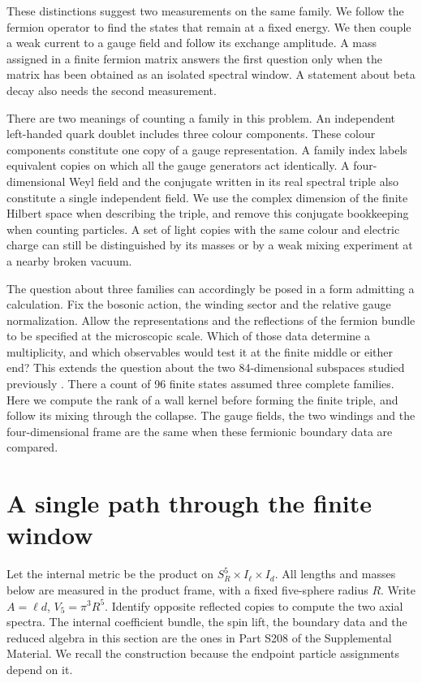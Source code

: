 \documentclass[aps,prd,reprint,onecolumn,nofootinbib,amsmath,amssymb]{revtex4-2}
\begin{document}
These distinctions suggest two measurements on the same family. We follow the fermion operator to find the states that remain at a fixed energy. We then couple a weak current to a gauge field and follow its exchange amplitude. A mass assigned in a finite fermion matrix answers the first question only when the matrix has been obtained as an isolated spectral window. A statement about beta decay also needs the second measurement.

There are two meanings of counting a family in this problem. An independent left-handed quark doublet includes three colour components. These colour components constitute one copy of a gauge representation. A family index labels equivalent copies on which all the gauge generators act identically. A four-dimensional Weyl field and the conjugate written in its real spectral triple also constitute a single independent field. We use the complex dimension of the finite Hilbert space when describing the triple, and remove this conjugate bookkeeping when counting particles. A set of light copies with the same colour and electric charge can still be distinguished by its masses or by a weak mixing experiment at a nearby broken vacuum.

The question about three families can accordingly be posed in a form admitting a calculation. Fix the bosonic action, the winding sector and the relative gauge normalization. Allow the representations and the reflections of the fermion bundle to be specified at the microscopic scale. Which of those data determine a multiplicity, and which observables would test it at the finite middle or either end? This extends the question about the two 84-dimensional subspaces studied previously \cite{gennote}. There a count of 96 finite states assumed three complete families. Here we compute the rank of a wall kernel before forming the finite triple, and follow its mixing through the collapse. The gauge fields, the two windings and the four-dimensional frame are the same when these fermionic boundary data are compared.

\section{A single path through the finite window}
Let the internal metric be the product on $S^5_R\times I_\ell\times I_d$. All lengths and masses below are measured in the product frame, with a fixed five-sphere radius $R$. Write $A=\ell d$, $V_5=\pi^3R^5$. Identify opposite reflected copies to compute the two axial spectra. The internal coefficient bundle, the spin lift, the boundary data and the reduced algebra in this section are the ones in Part S208 of the Supplemental Material. We recall the construction because the endpoint particle assignments depend on it.
\end{document}
